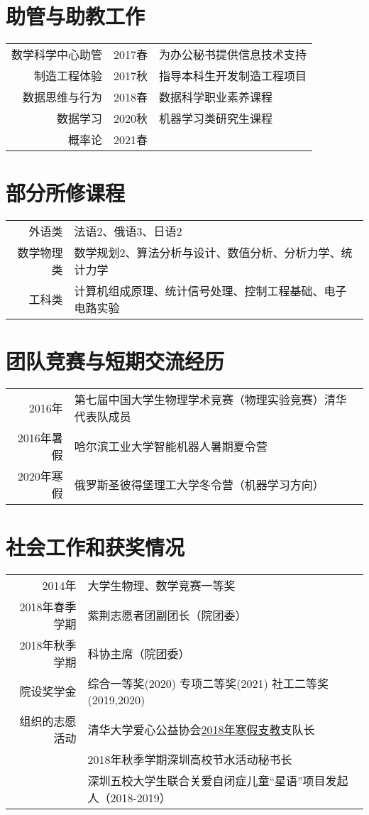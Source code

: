 \documentclass[12pt]{moderncv}
\begin{document}
\section{助管与助教工作}
\begin{tabular}{rll}
    数学科学中心助管 & 2017春 & 为办公秘书提供信息技术支持 \\
    制造工程体验   & 2017秋 & 指导本科生开发制造工程项目\\
    数据思维与行为 & 2018春 & 数据科学职业素养课程\\
    数据学习 &  2020秋 & 机器学习类研究生课程 \\
    概率论 &   2021春 & 
\end{tabular}
\section{部分所修课程}
\begin{tabular}{rl}
    外语类 & 法语2、俄语3、日语2 \\
    数学物理类 & 数学规划2、算法分析与设计、数值分析、分析力学、统计力学\\
    工科类 & 计算机组成原理、统计信号处理、控制工程基础、电子电路实验
\end{tabular}
\section{团队竞赛与短期交流经历}
\begin{tabular}{rl}
    2016年 & 第七届中国大学生物理学术竞赛（物理实验竞赛）清华代表队成员\\
    2016年暑假 & 哈尔滨工业大学智能机器人暑期夏令营 \\
    2020年寒假 & 俄罗斯圣彼得堡理工大学冬令营（机器学习方向）
\end{tabular}

\section{社会工作和获奖情况}

\begin{tabular}{rl}
2014年 & 大学生物理、数学竞赛一等奖 \\
2018年春季学期  & 紫荆志愿者团副团长（院团委）\\
2018年秋季学期 & 科协主席（院团委） \\
院设奖学金 & 综合一等奖(2020) 专项二等奖(2021) 社工二等奖 (2019,2020)\\
组织的志愿活动 & 清华大学爱心公益协会\href{http://leidenschaft.cn/volunteer0}{2018年寒假支教}支队长 \\
& 2018年秋季学期深圳高校节水活动秘书长 \\
& 深圳五校大学生联合关爱自闭症儿童“星语”项目发起人（2018-2019）
\end{tabular}
\end{document}
